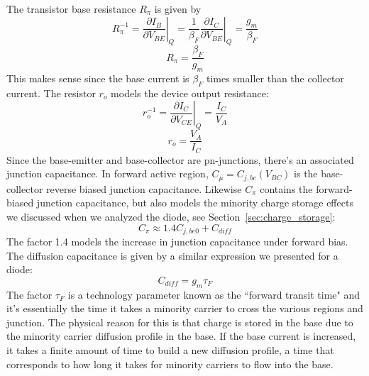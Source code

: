 The transistor base resistance $R_\pi$ is given by
%
\begin{equation}
	R_\pi^{-1} = \left. \frac{\partial I_B}{\partial V_{BE}} \right|_Q 
				= \frac{1}{\beta_F} \left. \frac{\partial I_C}{\partial V_{BE}}  \right|_Q
	 			= \frac{g_m}{\beta_F}
\end{equation}
%
\begin{equation}
	R_\pi = \frac{\beta_F}{g_m}
\end{equation}
%
This makes sense since the base current is $\beta_F$ times smaller than the collector current.  The resistor $r_o$ models the device output resistance: 
%
\begin{equation}
	r_o^{-1} = \left. \frac{\partial I_C}{\partial V_{CE}} \right|_Q  = \frac{I_C}{V_A}
\end{equation}
% 
%
\begin{equation}
	r_o = \frac{V_A}{I_C}
\end{equation}
% 
Since the base-emitter and base-collector are pn-junctions, there's an associated junction capacitance.  In forward active region, $C_{\mu} = C_{j,bc}(V_{BC})$ is the base-collector reverse biased junction capacitance.  Likewise $C_\pi$ contains the forward-biased junction capacitance, but also models the minority charge storage effects we discussed when we analyzed the diode, see Section~\ref{sec:charge_storage}:
%
\begin{equation}
	C_\pi \approx 1.4 C_{j,be0} + C_{diff}
\end{equation}
%
The factor 1.4 models the increase in junction capacitance under forward bias.  The diffusion capacitance is given by a similar expression we presented for a diode:
%
\begin{equation}
	C_{diff} = g_m \tau_F 
\end{equation}
%
The factor $\tau_F$ is a technology parameter known as the ``forward transit time" and it's essentially the time it takes a minority carrier to cross the various regions and junction.  The physical reason for this is that charge is stored in the base due to the minority carrier diffusion profile in the base.  If the base current is increased, it takes a finite amount of time to build a new diffusion profile, a time that corresponds to how long it takes for minority carriers to flow into the base.


